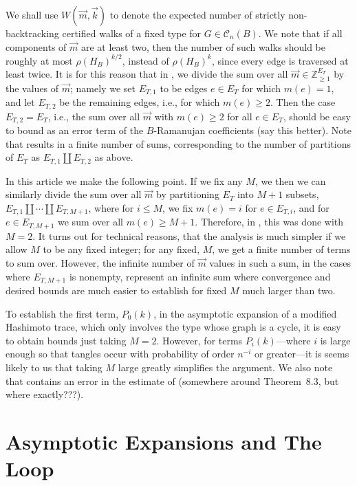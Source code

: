 \documentclass{memo-l}
\newenvironment{jfnote}{ \bgroup \color{blue} }{\egroup}
\newcommand{\mynote}[1]{\begin{jfnote}#1\end{jfnote}}
\theoremstyle{plain}
\theoremstyle{definition}
\numberwithin{section}{chapter}
\numberwithin{equation}{chapter}
\newcommand{\integers}{{\mathbb Z}}
\theoremstyle{plain}
\theoremstyle{definition}
\newcommand\cC{\mathcal{C}}
\begin{document}
{We shall use $W(\vec m,\vec k)$ to denote the expected number of strictly
non-backtracking certified walks of a fixed type for $G\in\cC_n(B)$.
We note that if all components of $\vec m$ are at least two, then
the number of such walks should be roughly at most
$\rho(H_B)^{k/2}$, instead of $\rho(H_B)^k$, since every edge is
traversed at least twice.  
It is for this reason that in \cite{friedman_random_graphs,friedman_alon},
we divide the sum over all
$\vec m\in\integers_{\ge 1}^{E_T}$ by the values of $\vec m$; namely
we set $E_{T,1}$ to be edges $e\in E_T$ for which $m(e)=1$, and
let $E_{T,2}$ be the remaining edges, i.e., for which $m(e)\ge 2$.
Then the case $E_{T,2}=E_T$, i.e., the sum over all $\vec m$ with
$m(e)\ge 2$ for all $e\in E_T$, should be easy to bound as an error
term of the $B$-Ramanujan coefficients 
\mynote{(say this better)}.
Note that results in a finite number of sums, corresponding to the
number of partitions of $E_T$ as $E_{T,1}\amalg E_{T,2}$ as above.

In this article we make the following point.
If we fix any $M$, we then we can similarly divide the
sum over all $\vec m$ by partitioning $E_T$ into $M+1$ subsets,
$E_{T,1}\amalg \cdots \amalg E_{T,M+1}$, where
for $i\le M$, we fix $m(e)=i$ for $e\in E_{T,i}$, and 
for $e\in E_{T,M+1}$ we sum over all $m(e)\ge M+1$.
Therefore, in \cite{friedman_random_graphs,friedman_alon}, this
was done with $M=2$.  
It turns out for technical reasons, that the analysis is much simpler
if we allow $M$ to be any fixed integer; for any fixed, $M$, we get
a finite number of terms to sum over.
However, the infinite number of $\vec m$ values in such a sum,
in the cases where
$E_{T,M+1}$ is nonempty,
represent an infinite sum where convergence and desired bounds are
much easier to 
establish for fixed $M$ much larger than two.

To establish the first term, $P_0(k)$, in the asymptotic expansion of
a modified Hashimoto trace, which only involves the type whose graph
is a cycle, it is easy to obtain bounds just taking $M=2$.  However,
for terms $P_i(k)$---where $i$ is large enough so that tangles occur
with probability of order $n^{-i}$ or greater---it is seems likely
to us that taking $M$ large greatly simplifies the argument.
We also note that \cite{friedman_alon} contains an error in the
estimate of 
\mynote{(somewhere around Theorem~8.3, but where exactly???)}.

}


\section{Asymptotic Expansions and The Loop}
\label{se:p0-loop}
\end{document}
